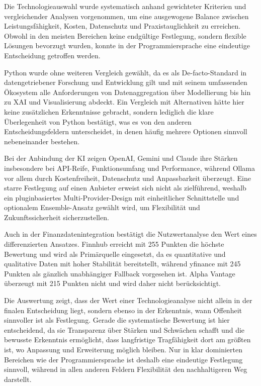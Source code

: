     Die Technologieauswahl wurde systematisch anhand gewichteter Kriterien und vergleichender Analysen vorgenommen, um eine ausgewogene Balance zwischen Leistungsfähigkeit, Kosten, Datenschutz und Praxistauglichkeit zu erreichen.
    Obwohl in den meisten Bereichen keine endgültige Festlegung, sondern flexible Lösungen bevorzugt wurden, konnte in der Programmiersprache eine eindeutige Entscheidung getroffen werden.

    Python wurde ohne weiteren Vergleich gewählt, da es als De-facto-Standard in datengetriebener Forschung und Entwicklung gilt und mit seinem umfassenden Ökosystem alle Anforderungen von Datenaggregation über Modellierung bis hin zu \acs{XAI} und Visualisierung abdeckt.
    Ein Vergleich mit Alternativen hätte hier keine zusätzlichen Erkenntnisse gebracht, sondern lediglich die klare Überlegenheit von Python bestätigt, was es von den anderen Entscheidungsfeldern unterscheidet, in denen häufig mehrere Optionen sinnvoll nebeneinander bestehen.

    Bei der Anbindung der \acs{KI} zeigen OpenAI, Gemini und Claude ihre Stärken insbesondere bei \acs{API}-Reife, Funktionsumfang und Performance, während Ollama vor allem durch Kostenfreiheit, Datenschutz und Anpassbarkeit überzeugt.
    Eine starre Festlegung auf einen Anbieter erweist sich nicht als zielführend, weshalb ein pluginbasiertes Multi-Provider-Design mit einheitlicher Schnittstelle und optionalem Ensemble-Ansatz gewählt wird, um Flexibilität und Zukunftssicherheit sicherzustellen.

    Auch in der Finanzdatenintegration bestätigt die Nutzwertanalyse den Wert eines differenzierten Ansatzes.
    Finnhub erreicht mit 255 Punkten die höchste Bewertung und wird als Primärquelle eingesetzt, da es quantitative und qualitative Daten mit hoher Stabilität bereitstellt, während yfinance mit 245 Punkten als gänzlich unabhängiger Fallback vorgesehen ist.
    Alpha Vantage überzeugt mit 215 Punkten nicht und wird daher nicht berücksichtigt.

    Die Auswertung zeigt, dass der Wert einer Technologieanalyse nicht allein in der finalen Entscheidung liegt, sondern ebenso in der Erkenntnis, wann Offenheit sinnvoller ist als Festlegung.
    Gerade die systematische Bewertung ist hier entscheidend, da sie Transparenz über Stärken und Schwächen schafft und die bewusste Erkenntnis ermöglicht, dass langfristige Tragfähigkeit dort am größten ist, wo Anpassung und Erweiterung möglich bleiben.
    Nur in klar dominierten Bereichen wie der Programmiersprache ist deshalb eine eindeutige Festlegung sinnvoll, während in allen anderen Feldern Flexibilität den nachhaltigeren Weg darstellt.



